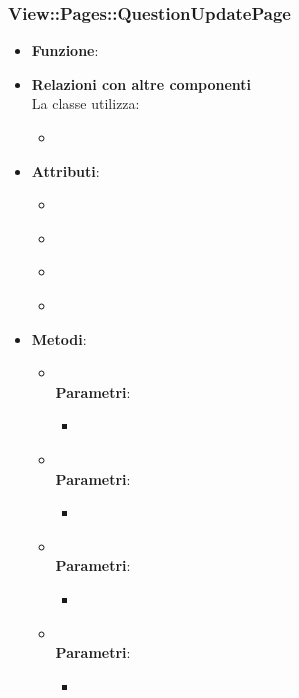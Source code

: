 \subsubsection{View::Pages::QuestionUpdatePage}
\begin{itemize}
\item\textbf{Funzione}:
\item\textbf{Relazioni con altre componenti}\\
La classe utilizza:
	\begin{itemize}
		\item
	\end{itemize}
\item\textbf{Attributi}:
	\begin{itemize}
		\item\code{}\\
		\item\code{}\\
		\item\code{}\\
		\item\code{}\\
	\end{itemize}
\item\textbf{Metodi}:
	\begin{itemize}
		\item\code{}\\
		\textbf{Parametri}:
			\begin{itemize}
				\item\code{}\\
			\end{itemize}
		\item\code{}\\
		\textbf{Parametri}:
			\begin{itemize}
				\item\code{}\\
			\end{itemize}
		\item\code{}\\
		\textbf{Parametri}:
			\begin{itemize}
				\item\code{}\\
			\end{itemize}
		\item\code{}\\
		\textbf{Parametri}:
			\begin{itemize}
				\item\code{}\\
			\end{itemize}
	\end{itemize}
\end{itemize}

